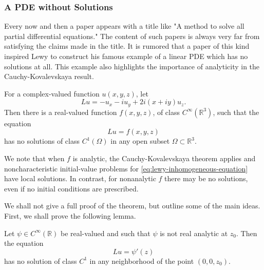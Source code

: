 \subsubsection{A PDE without Solutions}\label{subsec:pde-without-solutions}

Every now and then a paper appears with a title like "A method to solve all partial differential equations." The content of such papers is always very far from satisfying the claims made in the title. It is rumored that a paper of this kind inspired Lewy to construct his famous example of a linear PDE which has no solutions at all. This example also highlights the importance of analyticity in the Cauchy-Kovalevskaya result.

\begin{Theorem}
\label{thm:lewy-nonsolvability}
For a complex-valued function $u(x,y,z)$, let
\begin{equation}\label{eq:lewy-differential-operator}
Lu=-u_x-iu_y+2i(x+iy)u_z.
\end{equation}
Then there is a real-valued function $f(x,y,z)$, of class $C^\infty(\mathbb{R}^3)$, such that the equation
\begin{equation}\label{eq:lewy-inhomogeneous-equation}
Lu=f(x,y,z)
\end{equation}
has no solutions of class $C^1(\Omega)$ in any open subset $\Omega\subset\mathbb{R}^3$.
\end{Theorem}

We note that when $f$ is analytic, the Cauchy-Kovalevskaya theorem applies and noncharacteristic initial-value problems for \eqref{eq:lewy-inhomogeneous-equation} have local solutions. In contrast, for nonanalytic $f$ there may be no solutions, even if no initial conditions are prescribed.

We shall not give a full proof of the theorem, but outline some of the main ideas. First, we shall prove the following lemma.

\begin{Lemma}
\label{lem:lewy-local-nonsolvability}
Let $\psi\in C^\infty(\mathbb{R})$ be real-valued and such that $\psi$ is not real analytic at $z_0$. Then the equation
\begin{equation}\label{eq:lewy-local-obstruction-equation}
Lu=\psi'(z)
\end{equation}
has no solution of class $C^1$ in any neighborhood of the point $(0,0,z_0)$.
\end{Lemma}

